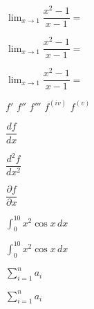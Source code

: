 \documentclass[a4paper, 12pt]{article}
\newcommand{\limite}{\displaystyle\lim} %
\begin{document}
$\lim_{x \to 1} \dfrac{ x^2 - 1 }{ x - 1 } = $

$\displaystyle \lim_{x \to 1} \dfrac{ x^2 - 1 }{ x - 1 } = $

$\limite_{x \to 1} \dfrac{ x^2 - 1 }{ x - 1 } = $

$f'$
$f''$
$f'''$
$f^{(iv)}$
$f^{(v)}$

$\dfrac{df}{dx}$

$\dfrac{d^2f}{dx^2}$

$\dfrac{ \partial f }{ \partial x }$

$\int_0^10 x ^ 2 \cos x \, dx$

$\displaystyle\int_0^10 x ^ 2 \cos x \, dx$

$\sum_{i=1}^n a_i$

$\displaystyle\sum_{i=1}^n a_i$
\end{document}
